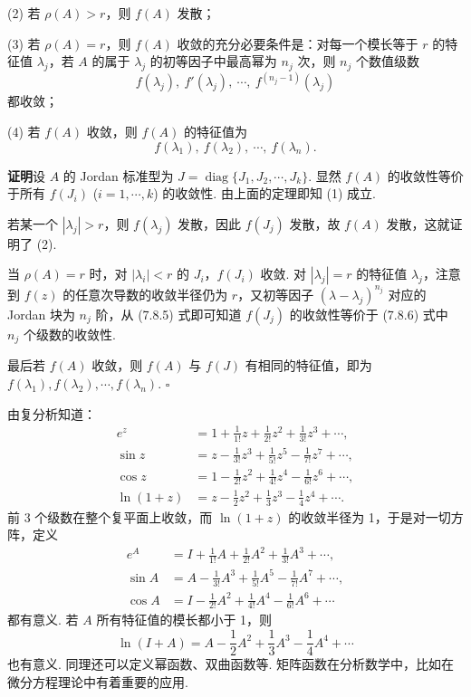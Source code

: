 \documentclass[UTF8, 12pt, fontset=fandol, oneside]{ctexart}
\begin{document}
(2) 若 $\rho(A)>r$，则 $f(A)$ 发散；

(3) 若 $\rho(A)=r$，则 $f(A)$ 收敛的充分必要条件是：对每一个模长等于 $r$ 的特征值 $\lambda_j$，若 $A$ 的属于 $\lambda_j$ 的初等因子中最高幂为 $n_j$ 次，则 $n_j$ 个数值级数
\begin{equation}
f(\lambda_j),\ f'(\lambda_j),\ \cdots,\ f^{(n_j-1)}(\lambda_j)
\tag{7.8.6}
\end{equation}
都收敛；

(4) 若 $f(A)$ 收敛，则 $f(A)$ 的特征值为
\[
f(\lambda_1),\ f(\lambda_2),\ \cdots,\ f(\lambda_n).
\]

\noindent\textbf{证明}\quad 设 $A$ 的 Jordan 标准型为 $J=\operatorname{diag}\{J_1,J_2,\cdots,J_k\}$. 显然 $f(A)$ 的收敛性等价于所有 $f(J_i)$ ($i=1,\cdots,k$) 的收敛性. 由上面的定理即知 (1) 成立.

若某一个 $|\lambda_j|>r$，则 $f(\lambda_j)$ 发散，因此 $f(J_j)$ 发散，故 $f(A)$ 发散，这就证明了 (2).

当 $\rho(A)=r$ 时，对 $|\lambda_i|<r$ 的 $J_i$，$f(J_i)$ 收敛. 对 $|\lambda_j|=r$ 的特征值 $\lambda_j$，注意到 $f(z)$ 的任意次导数的收敛半径仍为 $r$，又初等因子 $(\lambda-\lambda_j)^{n_j}$ 对应的 Jordan 块为 $n_j$ 阶，从 (7.8.5) 式即可知道 $f(J_j)$ 的收敛性等价于 (7.8.6) 式中 $n_j$ 个级数的收敛性.

最后若 $f(A)$ 收敛，则 $f(A)$ 与 $f(J)$ 有相同的特征值，即为 $f(\lambda_1),f(\lambda_2),\cdots,f(\lambda_n)$. $\square$

由复分析知道：
\[
\begin{aligned}
e^z&=1+\frac1{1!}z+\frac1{2!}z^2+\frac1{3!}z^3+\cdots,\\
\sin z&=z-\frac1{3!}z^3+\frac1{5!}z^5-\frac1{7!}z^7+\cdots,\\
\cos z&=1-\frac1{2!}z^2+\frac1{4!}z^4-\frac1{6!}z^6+\cdots,\\
\ln(1+z)&=z-\frac12z^2+\frac13z^3-\frac14z^4+\cdots.
\end{aligned}
\]
前 3 个级数在整个复平面上收敛，而 $\ln(1+z)$ 的收敛半径为 1，于是对一切方阵，定义
\[
\begin{aligned}
e^A&=I+\frac1{1!}A+\frac1{2!}A^2+\frac1{3!}A^3+\cdots,\\
\sin A&=A-\frac1{3!}A^3+\frac1{5!}A^5-\frac1{7!}A^7+\cdots,\\
\cos A&=I-\frac1{2!}A^2+\frac1{4!}A^4-\frac1{6!}A^6+\cdots
\end{aligned}
\]
都有意义. 若 $A$ 所有特征值的模长都小于 1，则
\[
\ln(I+A)=A-\frac12A^2+\frac13A^3-\frac14A^4+\cdots
\]
也有意义. 同理还可以定义幂函数、双曲函数等. 矩阵函数在分析数学中，比如在微分方程理论中有着重要的应用.
\end{document}
